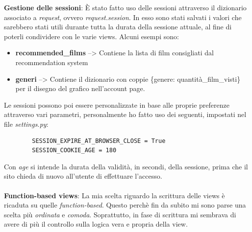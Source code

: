 \documentclass[12pt]{article}
\begin{document}
	\noindent \textbf{Gestione delle sessioni}: È stato fatto uso delle sessioni attraverso il dizionario associato a \textit{request}, ovvero \textit{request.session}. In esso sono stati salvati i valori che sarebbero stati utili durante tutta la durata della sessione attuale, al fine di poterli condividere con le varie views. Alcuni esempi sono:
	\begin{itemize}
		\item \textbf{recommended\_films} --> Contiene la lista di film consigliati dal recommendation system
		\item \textbf{generi} --> Contiene il dizionario con coppie \{genere: quantità\_film\_visti\} per il disegno del grafico nell'account page. \\
	\end{itemize}
	Le sessioni possono poi essere personalizzate in base alle proprie preferenze attraverso vari parametri, personalmente ho fatto uso dei seguenti, impostati nel file \textit{settings.py}:
	\begin{verbatim}
		SESSION_EXPIRE_AT_BROWSER_CLOSE = True
		SESSION_COOKIE_AGE = 180
	\end{verbatim}
	
	\noindent Con \textit{age} si intende la durata della validità, in secondi, della sessione, prima che il sito chieda di nuovo all'utente di effettuare l'accesso. \\ \\
	
	\noindent \textbf{Function-based views}: La mia scelta riguardo la scrittura delle views è ricaduta su quelle \textit{function-based}. Questo perchè fin da subito mi sono parse una scelta più \textit{ordinata} e \textit{comoda}. Soprattutto, in fase di scrittura mi sembrava di avere di più il controllo sulla logica vera e propria della view. \\ \\
	
\end{document}
